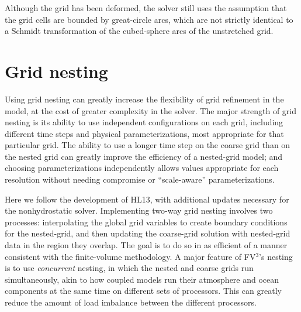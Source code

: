\documentclass[12pt,letterpaper]{book}
\newcommand{\fv}{FV$^{\mathrm{3}}$}
\begin{document}
Although the grid has been deformed, the solver still uses the assumption that the grid cells are bounded by great-circle arcs, which are not strictly identical to a Schmidt transformation of the cubed-sphere arcs of the unstretched grid.

\section{Grid nesting}

Using grid nesting can greatly increase the flexibility of grid refinement in the model, at the cost of greater complexity in the solver. The major strength of grid nesting is its ability to use independent configurations on each grid, including different time steps and physical parameterizations, most appropriate for that particular grid. The ability to use a longer time step on the coarse grid than on the nested grid can greatly improve the efficiency of a nested-grid model; and choosing parameterizations independently allows values appropriate for each resolution without needing compromise or ``scale-aware'' parameterizations.

Here we follow the development of HL13, with additional updates necessary for the nonhydrostatic solver.
Implementing two-way grid nesting involves two processes: interpolating the global grid variables to create boundary conditions for the nested-grid, and then updating the coarse-grid solution with nested-grid data in the region they overlap. The goal is to do so in as efficient of a manner consistent with the finite-volume methodology. A major feature of \fv's nesting is to use \textit{concurrent} nesting, in which the nested and coarse grids run simultaneously, akin to how coupled models run their atmosphere and ocean components at the same time on different sets of processors. This can greatly reduce the amount of load imbalance between the different processors.
\end{document}
